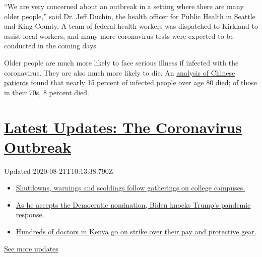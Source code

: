 ``We are very concerned about an outbreak in a setting where there are
many older people,'' said Dr. Jeff Duchin, the health officer for Public
Health in Seattle and King County. A team of federal health workers was
dispatched to Kirkland to assist local workers, and many more
coronavirus tests were expected to be conducted in the coming days.

Older people are much more likely to face serious illness if infected
with the coronavirus. They are also much more likely to die. An
\href{https://jamanetwork.com/journals/jama/fullarticle/2762130}{analysis
of Chinese patients} found that nearly 15 percent of infected people
over age 80 died; of those in their 70s, 8 percent died.

\hypertarget{latest-updates-the-coronavirus-outbreak}{%
\section{\texorpdfstring{\href{https://www.nytimes3xbfgragh.onion/2020/08/21/world/covid-19-coronavirus.html?action=click\&pgtype=Article\&state=default\&region=MAIN_CONTENT_1\&context=storylines_live_updates}{Latest
Updates: The Coronavirus
Outbreak}}{Latest Updates: The Coronavirus Outbreak}}\label{latest-updates-the-coronavirus-outbreak}}

Updated 2020-08-21T10:13:38.790Z

\begin{itemize}
\tightlist
\item
  \href{https://www.nytimes3xbfgragh.onion/2020/08/21/world/covid-19-coronavirus.html?action=click\&pgtype=Article\&state=default\&region=MAIN_CONTENT_1\&context=storylines_live_updates\#link-4690b6aa}{Shutdowns,
  warnings and scoldings follow gatherings on college campuses.}
\item
  \href{https://www.nytimes3xbfgragh.onion/2020/08/21/world/covid-19-coronavirus.html?action=click\&pgtype=Article\&state=default\&region=MAIN_CONTENT_1\&context=storylines_live_updates\#link-324af071}{As
  he accepts the Democratic nomination, Biden knocks Trump's pandemic
  response.}
\item
  \href{https://www.nytimes3xbfgragh.onion/2020/08/21/world/covid-19-coronavirus.html?action=click\&pgtype=Article\&state=default\&region=MAIN_CONTENT_1\&context=storylines_live_updates\#link-35890b73}{Hundreds
  of doctors in Kenya go on strike over their pay and protective gear.}
\end{itemize}

\href{https://www.nytimes3xbfgragh.onion/2020/08/21/world/covid-19-coronavirus.html?action=click\&pgtype=Article\&state=default\&region=MAIN_CONTENT_1\&context=storylines_live_updates}{See
more updates}


